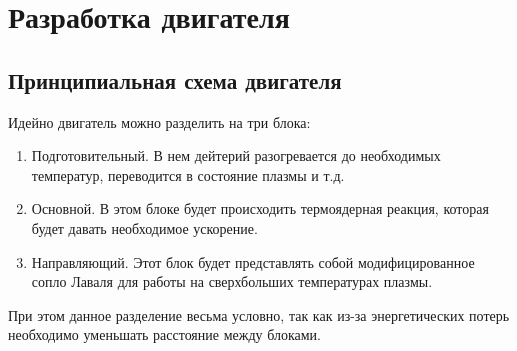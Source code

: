 \documentclass[a4paper,11pt]{article}
\begin{document}




\newpage
\section{Разработка двигателя}
\subsection{Принципиальная схема двигателя}
\indent Идейно двигатель можно разделить на три блока:
\begin{enumerate}
	\item Подготовительный. В нем дейтерий разогревается до необходимых температур, переводится в состояние плазмы и т.д. 
	\item Основной. В этом блоке будет происходить термоядерная реакция, которая будет давать необходимое ускорение.
	\item Направляющий. Этот блок будет представлять собой модифицированное сопло Лаваля для работы на сверхбольших температурах плазмы. 
\end{enumerate}
При этом данное разделение весьма условно, так как из-за энергетических потерь необходимо уменьшать расстояние между блоками. 
\end{document}
